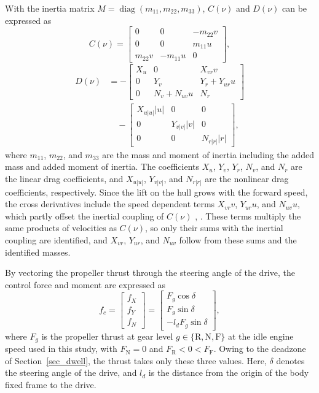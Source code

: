 \documentclass[lettersize,journal]{IEEEtran}
\newcommand{\gR}{\mathrm{R}}
\newcommand{\gN}{\mathrm{N}}
\newcommand{\gF}{\mathrm{F}}
\begin{document}
With the inertia matrix $M =\operatorname{diag}(m_{11}, m_{22}, m_{33})$, $C(\nu)$ and $D(\nu)$ can be expressed as
\begin{equation}
C(\nu) = \begin{bmatrix} 0 & 0 & -m_{22} v \\ 0 & 0 & m_{11} u \\ m_{22} v & -m_{11} u & 0 \end{bmatrix},
\label{eq_coriolis}
\end{equation}
\begin{equation}
\begin{aligned}
D(\nu) &= -\begin{bmatrix} X_u & 0 & X_{vr} v \\ 0 & Y_v & Y_r + Y_{ur} u \\ 0 & N_v + N_{uv} u & N_r \end{bmatrix} \\
&\quad - \begin{bmatrix} X_{u|u|}|u| & 0 & 0 \\ 0 & Y_{v|v|}|v| & 0 \\ 0 & 0 & N_{r|r|}|r| \end{bmatrix},
\end{aligned}
\label{eq_damping}
\end{equation}
where $m_{11}$, $m_{22}$, and $m_{33}$ are the mass and moment of inertia including the added mass and added moment of inertia. The coefficients $X_u$, $Y_v$, $Y_r$, $N_v$, and $N_r$ are the linear drag coefficients, and $X_{u|u|}$, $Y_{v|v|}$, and $N_{r|r|}$ are the nonlinear drag coefficients, respectively. Since the lift on the hull grows with the forward speed, the cross derivatives include the speed dependent terms $X_{vr} v$, $Y_{ur} u$, and $N_{uv} u$, which partly offset the inertial coupling of $C(\nu)$ \cite[Sec.~7.1.2]{fossen2011}, \cite{yasukawa2015mmg}. These terms multiply the same products of velocities as $C(\nu)$, so only their sums with the inertial coupling are identified, and $X_{vr}$, $Y_{ur}$, and $N_{uv}$ follow from these sums and the identified masses.

By vectoring the propeller thrust through the steering angle of the drive, the control force and moment are expressed as
\begin{equation}
f_c = \begin{bmatrix} f_X \\ f_Y \\ f_N \end{bmatrix}
= \begin{bmatrix} F_g\cos\delta \\ F_g\sin\delta \\ -l_d F_g\sin\delta \end{bmatrix},
\label{eq_force}
\end{equation}
where $F_g$ is the propeller thrust at gear level $g \in \{\gR, \gN, \gF\}$ at the idle engine speed used in this study, with $F_{\gN} = 0$ and $F_{\gR} < 0 < F_{\gF}$. Owing to the deadzone of Section~\ref{sec_dwell}, the thrust takes only these three values. Here, $\delta$ denotes the steering angle of the drive, and $l_d$ is the distance from the origin of the body fixed frame to the drive.
\end{document}
